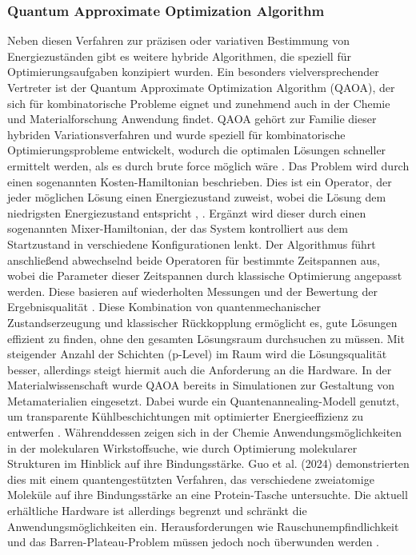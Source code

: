 \subsubsection*{Quantum Approximate Optimization Algorithm}
Neben diesen Verfahren zur präzisen oder variativen Bestimmung von Energiezuständen gibt es weitere hybride Algorithmen, die speziell für Optimierungsaufgaben konzipiert wurden. Ein besonders vielversprechender Vertreter ist der Quantum Approximate Optimization Algorithm (QAOA), der sich für kombinatorische Probleme eignet und zunehmend auch in der Chemie und Materialforschung Anwendung findet.
QAOA gehört zur Familie dieser hybriden Variationsverfahren und wurde speziell für kombinatorische Optimierungsprobleme entwickelt, wodurch die optimalen Lösungen schneller ermittelt werden, als es durch brute force möglich wäre \citealp[3]{guoHarnessingQuantumPower2024}. Das Problem wird durch einen sogenannten Kosten-Hamiltonian beschrieben. Dies ist ein Operator, der jeder möglichen Lösung einen Energiezustand zuweist, wobei die Lösung dem niedrigsten Energiezustand entspricht \citealp[24]{mottaEmergingQuantumComputing2022}, \citealp[8]{guoHarnessingQuantumPower2024}. Ergänzt wird dieser durch einen sogenannten Mixer-Hamiltonian, der das System kontrolliert aus dem Startzustand in verschiedene Konfigurationen lenkt. Der Algorithmus führt anschließend abwechselnd beide Operatoren für bestimmte Zeitspannen aus, wobei die Parameter dieser Zeitspannen durch klassische Optimierung angepasst werden. Diese basieren auf wiederholten Messungen und der Bewertung der Ergebnisqualität \citealp[8]{guoHarnessingQuantumPower2024}.
Diese Kombination von quantenmechanischer Zustandserzeugung und klassischer Rückkopplung ermöglicht es, gute Lösungen effizient zu finden, ohne den gesamten Lösungsraum durchsuchen zu müssen. Mit steigender Anzahl der Schichten (p-Level) im Raum wird die Lösungsqualität besser, allerdings steigt hiermit auch die Anforderung an die Hardware.
In der Materialwissenschaft wurde QAOA bereits in Simulationen zur Gestaltung von Metamaterialien eingesetzt. Dabei wurde ein Quantenannealing-Modell genutzt, um transparente Kühlbeschichtungen mit optimierter Energieeffizienz zu entwerfen \citealp[18]{guoHarnessingQuantumPower2024}. Währenddessen zeigen sich in der Chemie Anwendungsmöglichkeiten in der molekularen Wirkstoffsuche, wie durch Optimierung molekularer Strukturen im Hinblick auf ihre Bindungsstärke. Guo et al. (2024) demonstrierten dies mit einem quantengestützten Verfahren, das verschiedene zweiatomige Moleküle auf ihre Bindungsstärke an eine Protein-Tasche untersuchte. Die aktuell erhältliche Hardware ist allerdings begrenzt und schränkt die Anwendungsmöglichkeiten ein. Herausforderungen wie Rauschunempfindlichkeit und das Barren-Plateau-Problem müssen jedoch noch überwunden werden \citealp[12]{weidmanQuantumComputingChemistry2024a}.


